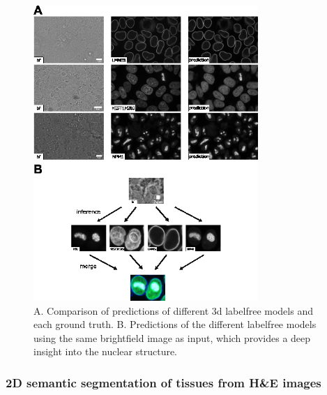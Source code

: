 \begin{figure}
\hypertarget{fig:labelfree_all_structures}{%
\centering
\includegraphics[width=0.76\textwidth,height=0.9\textheight]{images/labelfree_all_justin.png}
\caption{A. Comparison of predictions of different 3d labelfree models and each ground truth. B. Predictions of the different labelfree models using the same brightfield image as input, which provides a deep insight into the nuclear structure.}\label{fig:labelfree_all_structures}
}
\end{figure}

\hypertarget{d-semantic-segmentation-of-tissues-from-he-images}{%
\subsubsection{2D semantic segmentation of tissues from H\&E images}\label{d-semantic-segmentation-of-tissues-from-he-images}}

